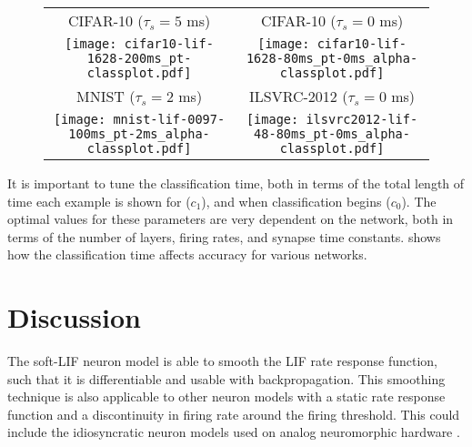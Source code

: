 \begin{figure}
  \centering
  \begin{tabular}{cc}
    CIFAR-10 ($\tau_s = 5$ ms) & CIFAR-10 ($\tau_s = 0$ ms) \\
    \texttt{[image: cifar10-lif-1628-200ms\_pt-classplot.pdf]} &
    \texttt{[image: cifar10-lif-1628-80ms\_pt-0ms\_alpha-classplot.pdf]} \\
    MNIST ($\tau_s = 2$ ms) & ILSVRC-2012 ($\tau_s = 0$ ms) \\
    \texttt{[image: mnist-lif-0097-100ms\_pt-2ms\_alpha-classplot.pdf]} &
    \texttt{[image: ilsvrc2012-lif-48-80ms\_pt-0ms\_alpha-classplot.pdf]} \\
  \end{tabular}
\end{figure}

It is important to tune the classification time,
both in terms of the total length of time each example is shown for ($c_1$),
and when classification begins ($c_0$).
The optimal values for these parameters are very dependent on the network,
both in terms of the number of layers, firing rates, and synapse time constants.
 shows how the classification time affects accuracy
for various networks.



\section{Discussion}

The soft-LIF neuron model is able to smooth the LIF rate response function,
such that it is differentiable and usable with backpropagation.
This smoothing technique is also applicable to other neuron models
with a static rate response function and a discontinuity in firing rate
around the firing threshold.
This could include the idiosyncratic neuron models
used on analog neuromorphic hardware \parencite[\eg/][]{Benjamin2014}.

